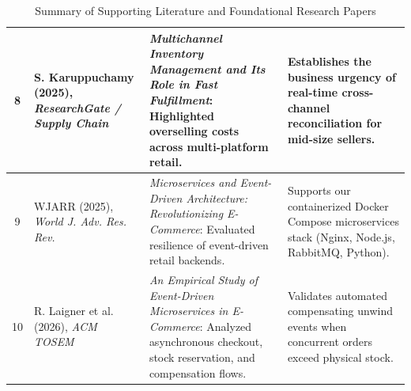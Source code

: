 \documentclass[oneside,a4paper,12pt]{report}
\begin{document}
\begin{table}[!htbp]
\begin{tabularx}{\textwidth}{|c|p{3.4cm}|X|p{3.6cm}|}
8 & S. Karuppuchamy (2025), \textit{ResearchGate / Supply Chain} \cite{karuppuchamy2025} & \textit{Multichannel Inventory Management and Its Role in Fast Fulfillment}: Highlighted overselling costs across multi-platform retail. & Establishes the business urgency of real-time cross-channel reconciliation for mid-size sellers. \\ \hline
9 & WJARR (2025), \textit{World J. Adv. Res. Rev.} \cite{wjarr2025} & \textit{Microservices and Event-Driven Architecture: Revolutionizing E-Commerce}: Evaluated resilience of event-driven retail backends. & Supports our containerized Docker Compose microservices stack (Nginx, Node.js, RabbitMQ, Python). \\ \hline
10 & R. Laigner et al. (2026), \textit{ACM TOSEM} \cite{laigner2026} & \textit{An Empirical Study of Event-Driven Microservices in E-Commerce}: Analyzed asynchronous checkout, stock reservation, and compensation flows. & Validates automated compensating unwind events when concurrent orders exceed physical stock. \\ \hline
\end{tabularx}
\caption{Summary of Supporting Literature and Foundational Research Papers}
\label{tab:lit_synopsis}
\end{table}
\end{document}
